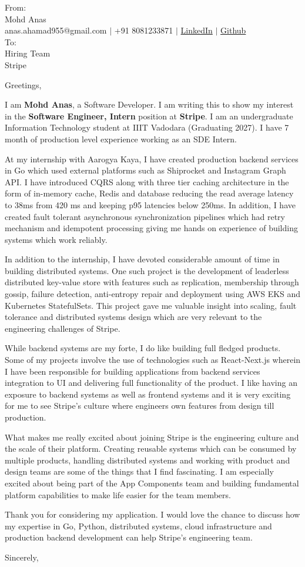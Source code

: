 \documentclass[10.5pt]{letter}
\begin{document}
\begin{letter}{
  From: \\
  Mohd  Anas \\
  anas.ahamad955@gmail.com $|$ +91 8081233871 $|$ \href{https://linkedin.com/in/anas-um}{LinkedIn} $|$ \href{https://github.com/Anas-github-acc}{Github} \\
  To: \\
  Hiring Team \\
  Stripe
}

\opening{Greetings,}
  I am \textbf{Mohd Anas}, a Software Developer. I am writing this to show my interest in the \textbf{Software Engineer, Intern} position at \textbf{Stripe}. I am an undergraduate Information Technology student at IIIT Vadodara (Graduating 2027). I have 7 month of production level experience working as an SDE Intern.

At my internship with Aarogya Kaya, I have created production backend services in Go which used external platforms such as Shiprocket and Instagram Graph API. I have introduced CQRS along with three tier caching architecture in the form of in-memory cache, Redis and database reducing the read average latency to 38ms from 420 ms and keeping p95 latencies below 250ms. In addition, I have created fault tolerant asynchronous synchronization pipelines which had retry mechanism and idempotent processing giving me hands on experience of building systems which work reliably.

In addition to the internship, I have devoted considerable amount of time in building distributed systems. One such project is the development of leaderless distributed key-value store with features such as replication, membership through gossip, failure detection, anti-entropy repair and deployment using AWS EKS and Kubernetes StatefulSets. This project gave me valuable insight into scaling, fault tolerance and distributed systems design which are very relevant to the engineering challenges of Stripe.

While backend systems are my forte, I do like building full fledged products. Some of my projects involve the use of technologies such as React-Next.js wherein I have been responsible for building applications from backend services integration to UI and delivering full functionality of the product. I like having an exposure to backend systems as well as frontend systems and it is very exciting for me to see Stripe's culture where engineers own features from design till production.

What makes me really excited about joining Stripe is the engineering culture and the scale of their platform. Creating reusable systems which can be consumed by multiple products, handling distributed systems and working with product and design teams are some of the things that I find fascinating. I am especially excited about being part of the App Components team and building fundamental platform capabilities to make life easier for the team members.

Thank you for considering my application. I would love the chance to discuss how my expertise in Go, Python, distributed systems, cloud infrastructure and production backend development can help Stripe's engineering team.

\closing{
  Sincerely,
}


\end{letter}
\end{document}
